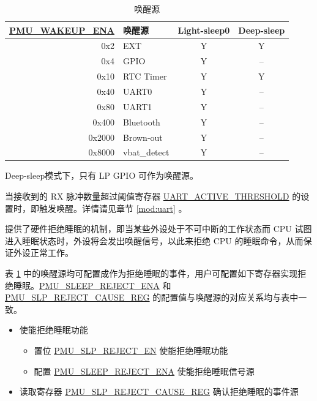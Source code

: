 \documentclass[main\_\_CN.tex]{subfiles}
\begin{document}
\begin{table}[H]
    \centering
    \caption{唤醒源}
    \label{tab:lowpowm-wakeup-source}
    \begin{threeparttable}
    \begin{tabular}{| r | l | c | c |}
    \hline
    \rowcolor{lightgray}
    \textbf{\hyperref[fielddesc:PMUWAKEUPENA]{PMU\_WAKEUP\_ENA}} & \textbf{唤醒源} &  \textbf{Light-sleep0} & \textbf{Deep-sleep}  \\\hline
    0x2 & EXT & Y & Y \\\hline
    0x4 & GPIO\tnote{1} & Y & –\\\hline
    0x10 & RTC Timer  & Y & Y \\\hline
    0x40 & UART0\tnote{2} & Y & – \\\hline
    0x80 & UART1\tnote{2} & Y & – \\\hline
    0x400 & Bluetooth & Y & – \\\hline
    0x2000 & Brown-out & Y & – \\\hline
    0x8000 & vbat\_detect & Y & – \\\hline
    \end{tabular}

\begin{tablenotes}
    \item[1] Deep-sleep模式下，只有 LP GPIO 可作为唤醒源。


    \item[2] 当接收到的 RX 脉冲数量超过阈值寄存器 \hyperref[fielddesc:UARTACTIVETHRESHOLD]{UART\_ACTIVE\_THRESHOLD} 的设置时，即触发唤醒。详情请见章节 \ref{mod:uart} \textit{}。

    \end{tablenotes}
    \end{threeparttable}
\end{table}

\chipname{} 提供了硬件拒绝睡眠的机制，即当某些外设处于不可中断的工作状态而 CPU 试图进入睡眠状态时，外设将会发出唤醒信号，以此来拒绝 CPU 的睡眠命令，从而保证外设正常工作。

表 \ref{tab:lowpowm-wakeup-source} 中的唤醒源均可配置成作为拒绝睡眠的事件，用户可配置如下寄存器实现拒绝睡眠。\hyperref[fielddesc:PMUSLEEPREJECTENA]{PMU\_SLEEP\_REJECT\_ENA} 和 \hyperref[fielddesc:PMUREJECTCAUSE]{PMU\_SLP\_REJECT\_CAUSE\_REG} 的配置值与唤醒源的对应关系均与表中一致。

\begin{itemize}
    \item  使能拒绝睡眠功能
        \begin{itemize}
            \item 置位 \hyperref[fielddesc:PMUSLPREJECTEN]{PMU\_SLP\_REJECT\_EN} 使能拒绝睡眠功能
            \item 配置 \hyperref[fielddesc:PMUSLEEPREJECTENA]{PMU\_SLEEP\_REJECT\_ENA} 使能拒绝睡眠信号源
        \end{itemize}
    \item 读取寄存器 \hyperref[fielddesc:PMUREJECTCAUSE]{PMU\_SLP\_REJECT\_CAUSE\_REG} 确认拒绝睡眠的事件源
\end{itemize}
\end{document}
